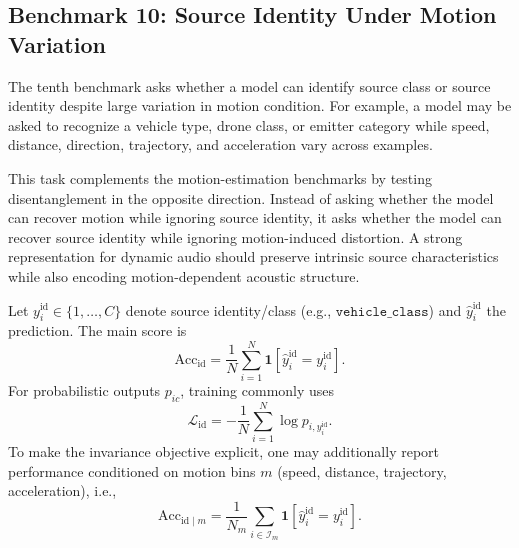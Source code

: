 \documentclass{article}
\begin{document}
\subsection{Benchmark 10: Source Identity Under Motion Variation}

The tenth benchmark asks whether a model can identify source class or source identity despite large variation in motion condition. For example, a model may be asked to recognize a vehicle type, drone class, or emitter category while speed, distance, direction, trajectory, and acceleration vary across examples.

This task complements the motion-estimation benchmarks by testing disentanglement in the opposite direction. Instead of asking whether the model can recover motion while ignoring source identity, it asks whether the model can recover source identity while ignoring motion-induced distortion. A strong representation for dynamic audio should preserve intrinsic source characteristics while also encoding motion-dependent acoustic structure.

Let \(y_i^{\text{id}}\in\{1,\dots,C\}\) denote source identity/class (e.g., \(\texttt{vehicle\_class}\)) and \(\hat y_i^{\text{id}}\) the prediction. The main score is
\begin{equation}
  \mathrm{Acc}_{\text{id}}=\frac{1}{N}\sum_{i=1}^{N}\mathbf{1}\!\left[\hat y_i^{\text{id}}=y_i^{\text{id}}\right].
\end{equation}
For probabilistic outputs \(p_{ic}\), training commonly uses
\begin{equation}
  \mathcal{L}_{\text{id}}=-\frac{1}{N}\sum_{i=1}^{N}\log p_{i,y_i^{\text{id}}}.
\end{equation}
To make the invariance objective explicit, one may additionally report performance conditioned on motion bins \(m\) (speed, distance, trajectory, acceleration), i.e.,
\begin{equation}
  \mathrm{Acc}_{\text{id}\mid m}=\frac{1}{N_m}\sum_{i\in\mathcal{I}_m}\mathbf{1}\!\left[\hat y_i^{\text{id}}=y_i^{\text{id}}\right].
\end{equation}
\end{document}
